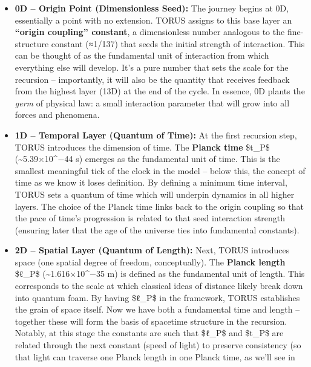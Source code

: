 \documentclass[
]{article}
\begin{document}
\begin{itemize}
\item
  \textbf{0D -- Origin Point (Dimensionless Seed):} The journey begins
  at 0D, essentially a point with no extension. TORUS assigns to this
  base layer an \textbf{``origin coupling'' constant}, a dimensionless
  number analogous to the fine-structure constant (≈1/137) that seeds
  the initial strength of interaction\hspace{0pt}. This can be thought
  of as the fundamental unit of interaction from which everything else
  will develop. It's a pure number that sets the scale for the recursion
  -- importantly, it will also be the quantity that receives feedback
  from the highest layer (13D) at the end of the cycle. In essence, 0D
  plants the \emph{germ} of physical law: a small interaction parameter
  that will grow into all forces and phenomena.
\item
  \textbf{1D -- Temporal Layer (Quantum of Time):} At the first
  recursion step, TORUS introduces the dimension of time. The
  \textbf{Planck time} \$t\_P\$ (\textasciitilde5.39×10\^{}−44 s)
  emerges as the fundamental unit of time\hspace{0pt}. This is the
  smallest meaningful tick of the clock in the model -- below this, the
  concept of time as we know it loses definition. By defining a minimum
  time interval, TORUS sets a quantum of time which will underpin
  dynamics in all higher layers. The choice of the Planck time links
  back to the origin coupling so that the pace of time's progression is
  related to that seed interaction strength (ensuring later that the age
  of the universe ties into fundamental constants).
\item
  \textbf{2D -- Spatial Layer (Quantum of Length):} Next, TORUS
  introduces space (one spatial degree of freedom, conceptually). The
  \textbf{Planck length} \$ℓ\_P\$ (\textasciitilde1.616×10\^{}−35 m) is
  defined as the fundamental unit of length\hspace{0pt}. This
  corresponds to the scale at which classical ideas of distance likely
  break down into quantum foam. By having \$ℓ\_P\$ in the framework,
  TORUS establishes the grain of space itself. Now we have both a
  fundamental time and length -- together these will form the basis of
  spacetime structure in the recursion. Notably, at this stage the
  constants are such that \$ℓ\_P\$ and \$t\_P\$ are related through the
  next constant (speed of light) to preserve consistency (so that light
  can traverse one Planck length in one Planck time, as we'll see in

\end{itemize}
\end{document}
